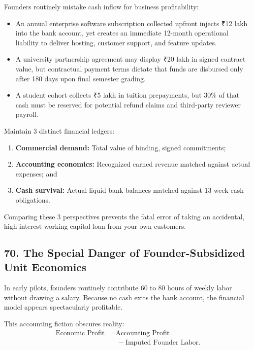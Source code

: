 Founders routinely mistake cash inflow for business profitability:
\begin{itemize}
    \item An annual enterprise software subscription collected upfront injects ₹12 lakh into the bank account, yet creates an immediate 12-month operational liability to deliver hosting, customer support, and feature updates.
    \item A university partnership agreement may display ₹20 lakh in signed contract value, but contractual payment terms dictate that funds are disbursed only after 180 days upon final semester grading.
    \item A student cohort collects ₹5 lakh in tuition prepayments, but 30\% of that cash must be reserved for potential refund claims and third-party reviewer payroll.
\end{itemize}

Maintain 3 distinct financial ledgers:
\begin{enumerate}
    \item \textbf{Commercial demand:} Total value of binding, signed commitments;
    \item \textbf{Accounting economics:} Recognized earned revenue matched against actual expenses; and
    \item \textbf{Cash survival:} Actual liquid bank balances matched against 13-week cash obligations.
\end{enumerate}

Comparing these 3 perspectives prevents the fatal error of taking an accidental, high-interest working-capital loan from your own customers.

\subsection*{70. The Special Danger of Founder-Subsidized Unit Economics}

In early pilots, founders routinely contribute 60 to 80 hours of weekly labor without drawing a salary. Because no cash exits the bank account, the financial model appears spectacularly profitable.

This accounting fiction obscures reality:
\begin{equation}
\begin{aligned}
\text{Economic Profit} &= \text{Accounting Profit} \\
&\quad - \text{Imputed Founder Labor}.
\end{aligned}
\end{equation}

